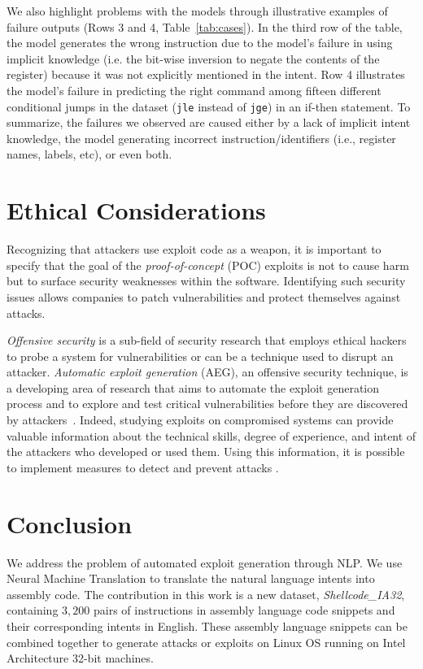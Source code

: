 \documentclass[11pt,a4paper]{article}
\newcommand{\datasetname}[1]{\emph{Shellcode\_IA32}}
\begin{document}
We also highlight problems with the models through illustrative examples of failure outputs (Rows 3 and 4, Table~\ref{tab:cases}).
In the third row of the table, the model generates the wrong instruction due to the model's failure in using implicit knowledge (i.e. the bit-wise inversion to negate the contents of the register) because it was not explicitly mentioned in the intent. 
Row 4 illustrates the model's failure in predicting the right command among fifteen different conditional jumps in the dataset (\texttt{jle} instead of \texttt{jge}) in an if-then statement.  
To summarize, the failures we observed are caused either by a lack of implicit intent knowledge, the model generating incorrect instruction/identifiers (i.e., register names, labels, etc), or even both.



 
\section{Ethical Considerations}
\label{sec:ethics}
Recognizing that attackers use exploit code as a weapon, it is important to specify that the goal of the \textit{proof-of-concept} (POC) exploits is not to cause harm but to surface security weaknesses within the software. Identifying such security issues allows companies to patch vulnerabilities and protect themselves against attacks. 

\emph{Offensive security} is a sub-field of security research that employs ethical hackers to probe a system for vulnerabilities or can be a technique used to disrupt an attacker. \emph{Automatic exploit generation} (AEG), an offensive security technique, is a developing area of research that aims to automate the exploit generation process and to explore and test critical vulnerabilities before they are discovered by attackers~\cite{aeg}. Indeed, studying exploits on compromised systems can provide valuable information about the technical skills, degree of experience, and intent of the attackers who developed or used them. Using this information, it is possible to implement measures to detect and prevent attacks \cite{arce2004shellcode}. 
\section{Conclusion}
\label{sec:conclusion}
We address the problem of automated exploit generation through NLP. We use Neural Machine Translation to translate the natural language intents into assembly code.
The contribution in this work is a new dataset, \datasetname{}, containing $3,200$ pairs of instructions in assembly language code snippets and their corresponding intents in English. These assembly language snippets can be combined together to generate attacks or exploits on Linux OS running on Intel Architecture 32-bit machines.  
\end{document}
